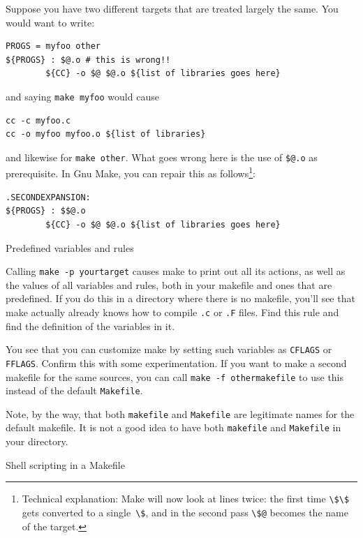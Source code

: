 Suppose you have two different targets that are treated largely the
same. You would want to write:
\begin{lstlisting}
PROGS = myfoo other
${PROGS} : $@.o # this is wrong!!
        ${CC} -o $@ $@.o ${list of libraries goes here}
\end{lstlisting}
and saying \lstinline{make myfoo} would cause 
\begin{lstlisting}
cc -c myfoo.c
cc -o myfoo myfoo.o ${list of libraries}
\end{lstlisting}
and likewise for \lstinline{make other}. What goes wrong here is the use of
\verb+$@.o+ as prerequisite. In Gnu Make, you can repair this as
follows\footnote{Technical explanation: Make will now look at lines
  twice: the first time \lstinline{\$\$} gets converted to a single~\lstinline{\$},
  and in the second pass \lstinline{\$@} becomes the name of the target.}:
\begin{lstlisting}
.SECONDEXPANSION:
${PROGS} : $$@.o
        ${CC} -o $@ $@.o ${list of libraries goes here}
\end{lstlisting}


 {Predefined variables and rules}

Calling \lstinline{make -p yourtarget} causes make to print out all its
actions, as well as the values of all variables and rules, both in
your makefile and ones that are predefined. If you do this in a
directory where there is no makefile, you'll see that make actually
already knows how to compile \lstinline{.c} or \lstinline{.F} files. Find this rule
and find the definition of the variables in it.

You see that you can customize make by setting such variables as
\lstinline{CFLAGS} or \lstinline{FFLAGS}. Confirm this with some experimentation. If
you want to make a second makefile for the same sources, you can call
\lstinline{make -f othermakefile} to use this instead of the default
\lstinline{Makefile}.

Note, by the way, that both \lstinline{makefile} and \lstinline{Makefile} are
legitimate names for the default makefile. It is not a good idea to
have both \lstinline{makefile} and \lstinline{Makefile} in your directory.

 {Shell scripting in a Makefile}
\label{sec:make-shell}

